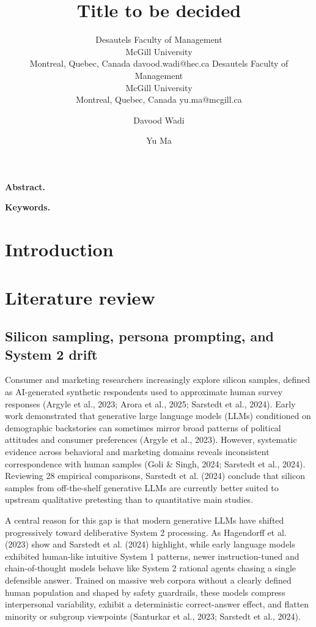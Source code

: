 \documentclass[
  11pt,
  letterpaper,
]{article}
\author{%
    \aclauthor{Davood Wadi}
      {Desautels Faculty of Management\\ McGill University\\ Montreal, Quebec, Canada}
      {davood.wadi@hec.ca}%
    \hspace{3em}%
    \aclauthor{Yu Ma}
      {Desautels Faculty of Management\\ McGill University\\ Montreal, Quebec, Canada}
      {yu.ma@mcgill.ca}%
  }%
\title{Title to be decided}
\author{Davood Wadi \and Yu Ma}
\date{}
\begin{document}
\maketitle


\textbf{Abstract.}

\textbf{Keywords.}

\section{Introduction}\label{sec-intro}

\section{Literature review}\label{sec-lit}

\subsection{Silicon sampling, persona prompting, and System 2
drift}\label{silicon-sampling-persona-prompting-and-system-2-drift}

Consumer and marketing researchers increasingly explore silicon samples,
defined as AI-generated synthetic respondents used to approximate human
survey responses (Argyle et al., 2023; Arora et al., 2025; Sarstedt et
al., 2024). Early work demonstrated that generative large language
models (LLMs) conditioned on demographic backstories can sometimes
mirror broad patterns of political attitudes and consumer preferences
(Argyle et al., 2023). However, systematic evidence across behavioral
and marketing domains reveals inconsistent correspondence with human
samples (Goli \& Singh, 2024; Sarstedt et al., 2024). Reviewing 28
empirical comparisons, Sarstedt et al. (2024) conclude that silicon
samples from off-the-shelf generative LLMs are currently better suited
to upstream qualitative pretesting than to quantitative main studies.

A central reason for this gap is that modern generative LLMs have
shifted progressively toward deliberative System 2 processing. As
Hagendorff et al. (2023) show and Sarstedt et al. (2024) highlight,
while early language models exhibited human-like intuitive System 1
patterns, newer instruction-tuned and chain-of-thought models behave
like System 2 rational agents chasing a single defensible answer.
Trained on massive web corpora without a clearly defined human
population and shaped by safety guardrails, these models compress
interpersonal variability, exhibit a deterministic correct-answer
effect, and flatten minority or subgroup viewpoints (Santurkar et al.,
2023; Sarstedt et al., 2024).
\end{document}
